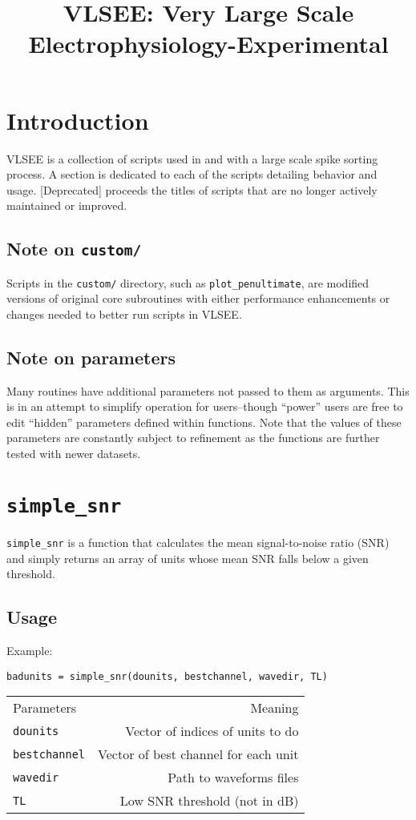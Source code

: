 \documentclass{article}
\title{VLSEE: Very Large Scale Electrophysiology-Experimental}
\author{}
\date{}
\begin{document}
\maketitle

\tableofcontents

\section{Introduction}
VLSEE is a collection of scripts used in and with a large scale spike sorting
process. A section is dedicated to each of the scripts detailing behavior
and usage. [Deprecated] proceeds the titles of scripts that are no longer
actively maintained or improved.

\subsection{Note on \texttt{custom/}}
Scripts in the \texttt{custom/} directory, such as
\texttt{plot\_penultimate}, are modified versions of original core
subroutines with either performance enhancements or changes needed to
better run scripts in VLSEE.

\subsection{Note on parameters}
Many routines have additional parameters not passed to them as
arguments. This is in an attempt to simplify operation for users--though
``power'' users are free to edit ``hidden'' parameters defined within
functions. Note that the values of these parameters are constantly
subject to refinement as the functions are further tested with newer
datasets. 

\section{\texttt{simple\_snr}}
\texttt{simple\_snr} is a function that calculates the mean signal-to-noise
ratio (SNR) and simply returns an array of units whose mean SNR falls below
a given threshold.

\subsection{Usage}
Example:

\texttt{badunits = simple\_snr(dounits, bestchannel, wavedir, TL)}
\begin{center}
\begin{tabular}{l r}
Parameters&Meaning\\
\texttt{dounits}&Vector of indices of units to do\\
\texttt{bestchannel}&Vector of best channel for each unit\\
\texttt{wavedir}&Path to waveforms files\\
\texttt{TL}&Low SNR threshold (not in dB)

\end{tabular}
\end{center}
\end{document}
